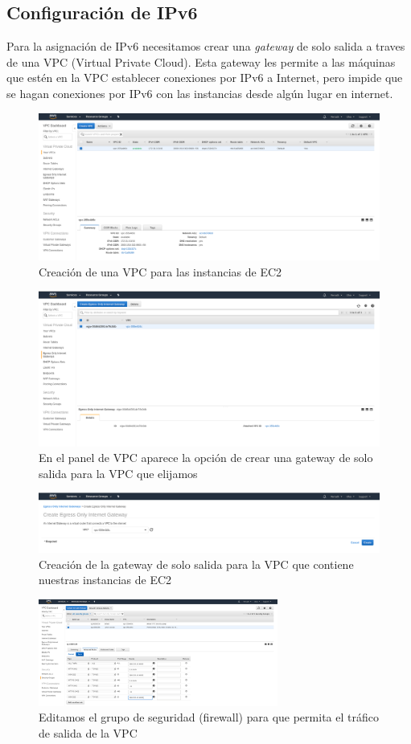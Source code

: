 \documentclass[9pt]{article}
\begin{document}
\subsection{Configuración de IPv6}
Para la asignación de IPv6 necesitamos crear una \textit{gateway} de solo salida a traves de una \textsf{VPC} (Virtual Private Cloud). Esta gateway les permite a las máquinas que estén en la VPC establecer conexiones por IPv6 a Internet, pero impide que se hagan conexiones por IPv6 con las instancias desde algún lugar en internet.
\\
\begin{figure}[H]
  \centering
  \includegraphics[width=0.8\linewidth]{vpc}
  \caption{Creación de una VPC para las instancias de EC2}
\end{figure}
\begin{figure}
  \centering
  \includegraphics[width=0.8\linewidth]{vpc_egress_only}
  \caption{En el panel de VPC aparece la opción de crear una gateway de solo salida para la VPC que elijamos}
\end{figure}
\begin{figure}[H]
  \centering
  \includegraphics[width=0.8\linewidth]{egress_only_gateway}
  \caption{Creación de la gateway de solo salida para la VPC que contiene nuestras instancias de EC2}
\end{figure}
\begin{figure}[H]
  \centering
  \includegraphics[width=0.7\textwidth]{edit_security_group}
  \caption{Editamos el grupo de seguridad (firewall) para que permita el tráfico  de salida de la VPC}
\end{figure}
\end{document}
